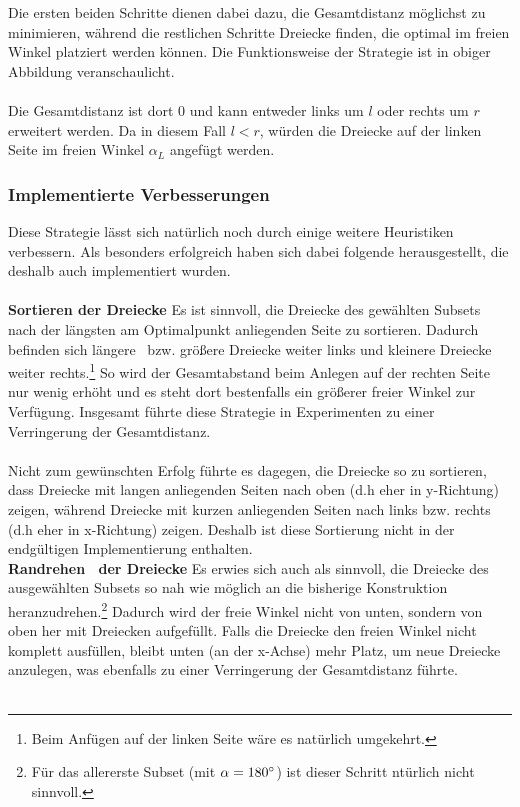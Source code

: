 \documentclass[a4paper, notitlepage, 12pt,headinclude]{scrartcl}
\begin{document}
Die ersten beiden Schritte dienen dabei dazu, die Gesamtdistanz möglichst zu minimieren, während die restlichen Schritte Dreiecke finden, die optimal im freien Winkel platziert werden können. Die Funktionsweise der Strategie ist in obiger Abbildung veranschaulicht. \\ \\
Die Gesamtdistanz ist dort 0 und kann entweder links um $l$ oder rechts um $r$ erweitert werden. Da in diesem Fall $l < r$, würden die Dreiecke auf der linken Seite im freien Winkel $\alpha_L$ angefügt werden.
\subsubsection{Implementierte Verbesserungen}
Diese Strategie lässt sich natürlich noch durch einige weitere Heuristiken verbessern. Als besonders erfolgreich haben sich dabei folgende herausgestellt, die deshalb auch implementiert wurden. \\ \\
\textbf{Sortieren der Dreiecke} \quad Es ist sinnvoll, die Dreiecke des gewählten Subsets nach der längsten am Optimalpunkt anliegenden Seite zu sortieren. Dadurch befinden sich \glqq längere\grqq~ bzw. größere Dreiecke weiter links und kleinere Dreiecke weiter rechts.\footnote{Beim Anfügen auf der linken Seite wäre es natürlich umgekehrt.} So wird der Gesamtabstand beim Anlegen auf der rechten Seite nur wenig erhöht und es steht dort bestenfalls ein größerer freier Winkel zur Verfügung. Insgesamt führte diese Strategie in Experimenten zu einer Verringerung der Gesamtdistanz. \\ \\
Nicht zum gewünschten Erfolg führte es dagegen, die Dreiecke so zu sortieren, dass Dreiecke mit langen anliegenden Seiten nach oben (d.h eher in y-Richtung) zeigen, während Dreiecke mit kurzen anliegenden Seiten nach links bzw. rechts (d.h eher in x-Richtung) zeigen. Deshalb ist diese Sortierung nicht in der endgültigen Implementierung enthalten. \\
\textbf{\glqq Randrehen\grqq~ der Dreiecke} \quad Es erwies sich auch als sinnvoll, die Dreiecke des ausgewählten Subsets so nah wie möglich an die bisherige Konstruktion heranzudrehen.\footnote{Für das allererste Subset (mit $\alpha = 180\degree$) ist dieser Schritt ntürlich nicht sinnvoll.} Dadurch wird der freie Winkel nicht von unten, sondern von oben her mit Dreiecken aufgefüllt. Falls die Dreiecke den freien Winkel nicht komplett ausfüllen, bleibt unten (an der x-Achse) mehr Platz, um neue Dreiecke anzulegen, was ebenfalls zu einer Verringerung der Gesamtdistanz führte. \\ \\ 
\end{document}
